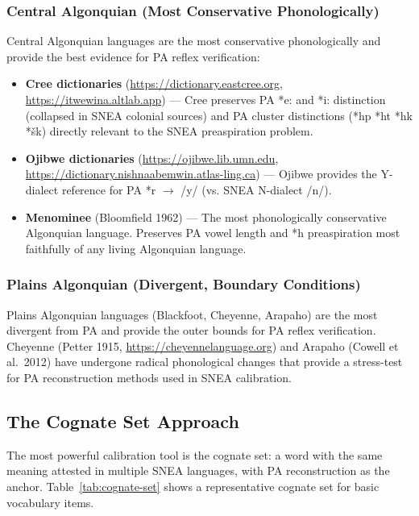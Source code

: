 \subsubsection{Central Algonquian (Most Conservative Phonologically)}

Central Algonquian languages are the most conservative phonologically and
provide the best evidence for PA reflex verification:

\begin{itemize}
  \item \textbf{Cree dictionaries} (\url{https://dictionary.eastcree.org},
    \url{https://itwewina.altlab.app}) --- Cree preserves PA *e: and *i:
    distinction (collapsed in SNEA colonial sources) and PA cluster
    distinctions (*hp *ht *hk *\v{s}k) directly relevant to the SNEA
    preaspiration problem.
  \item \textbf{Ojibwe dictionaries} (\url{https://ojibwe.lib.umn.edu},
    \url{https://dictionary.nishnaabemwin.atlas-ling.ca}) --- Ojibwe provides
    the Y-dialect reference for PA *r $\rightarrow$ /y/ (vs. SNEA N-dialect
    /n/).
  \item \textbf{Menominee} (Bloomfield 1962) --- The most phonologically
    conservative Algonquian language. Preserves PA vowel length and *h
    preaspiration most faithfully of any living Algonquian language.
\end{itemize}

\subsubsection{Plains Algonquian (Divergent, Boundary Conditions)}

Plains Algonquian languages (Blackfoot, Cheyenne, Arapaho) are the most
divergent from PA and provide the outer bounds for PA reflex verification.
Cheyenne (Petter 1915, \url{https://cheyennelanguage.org}) and Arapaho
(Cowell et al.\ 2012) have undergone radical phonological changes that
provide a stress-test for PA reconstruction methods used in SNEA calibration.
\subsection{The Cognate Set Approach}

The most powerful calibration tool is the cognate set: a word with the same
meaning attested in multiple SNEA languages, with PA reconstruction as the
anchor. Table~\ref{tab:cognate-set} shows a representative cognate set for
basic vocabulary items.


